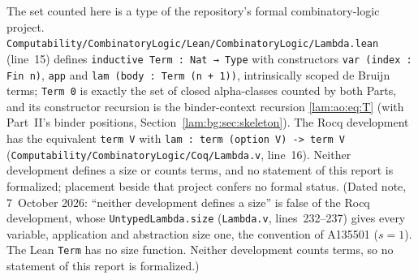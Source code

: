 \documentclass[11pt,a4paper]{article}
\numberwithin{equation}{section}
\theoremstyle{remark}
\newcommand{\file}[1]{\nolinkurl{#1}}
\begin{document}
The set counted here is a type of the repository's formal combinatory-logic project. \file{Computability/CombinatoryLogic/Lean/CombinatoryLogic/Lambda.lean} (line~15) defines \texttt{inductive Term : Nat → Type} with constructors \texttt{var (index : Fin n)}, \texttt{app} and \texttt{lam (body : Term (n + 1))}, intrinsically scoped de Bruijn terms; \texttt{Term 0} is exactly the set of closed alpha-classes counted by both Parts, and its constructor recursion is the binder-context recursion \eqref{lam:ao:eq:T} (with Part~II's binder positions, Section~\ref{lam:bg:sec:skeleton}). The Rocq development has the equivalent \texttt{term V} with \texttt{lam : term (option V) -> term V} (\file{Computability/CombinatoryLogic/Coq/Lambda.v}, line~16). Neither development defines a size or counts terms, and no statement of this report is formalized; placement beside that project confers no formal status. (Dated note, 7~October 2026: ``neither development defines a size'' is false of the Rocq development, whose \texttt{UntypedLambda.size} (\file{Lambda.v}, lines~232--237) gives every variable, application and abstraction size one, the convention of A135501 ($s=1$). The Lean \texttt{Term} has no size function. Neither development counts terms, so no statement of this report is formalized.)

\clearpage
\end{document}

